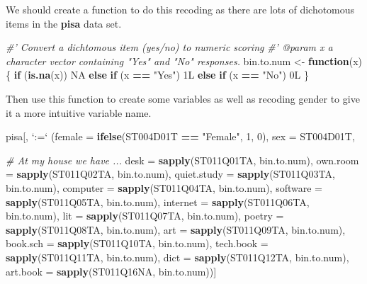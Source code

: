 \documentclass[]{book}
\newenvironment{Shaded}{\begin{snugshade}}{\end{snugshade}}
\newcommand{\CommentTok}[1]{\textcolor[rgb]{0.56,0.35,0.01}{\textit{#1}}}
\newcommand{\ControlFlowTok}[1]{\textcolor[rgb]{0.13,0.29,0.53}{\textbf{#1}}}
\newcommand{\DataTypeTok}[1]{\textcolor[rgb]{0.13,0.29,0.53}{#1}}
\newcommand{\DecValTok}[1]{\textcolor[rgb]{0.00,0.00,0.81}{#1}}
\newcommand{\KeywordTok}[1]{\textcolor[rgb]{0.13,0.29,0.53}{\textbf{#1}}}
\newcommand{\NormalTok}[1]{#1}
\newcommand{\OperatorTok}[1]{\textcolor[rgb]{0.81,0.36,0.00}{\textbf{#1}}}
\newcommand{\OtherTok}[1]{\textcolor[rgb]{0.56,0.35,0.01}{#1}}
\newcommand{\StringTok}[1]{\textcolor[rgb]{0.31,0.60,0.02}{#1}}
\begin{document}
We should create a function to do this recoding as there are lots of dichotomous items in the \textbf{pisa} data set.

\begin{Shaded}
\begin{Highlighting}[]
\CommentTok{#' Convert a dichtomous item (yes/no) to numeric scoring}
\CommentTok{#' @param x a character vector containing "Yes" and "No" responses.}
\NormalTok{bin.to.num <-}\StringTok{ }\ControlFlowTok{function}\NormalTok{(x)\{}
  \ControlFlowTok{if}\NormalTok{ (}\KeywordTok{is.na}\NormalTok{(x)) }\OtherTok{NA}
  \ControlFlowTok{else} \ControlFlowTok{if}\NormalTok{ (x }\OperatorTok{==}\StringTok{ "Yes"}\NormalTok{) 1L}
  \ControlFlowTok{else} \ControlFlowTok{if}\NormalTok{ (x }\OperatorTok{==}\StringTok{ "No"}\NormalTok{) 0L}
\NormalTok{\}}
\end{Highlighting}
\end{Shaded}

Then use this function to create some variables as well as recoding gender to give it a more intuitive variable name.

\begin{Shaded}
\begin{Highlighting}[]
\NormalTok{pisa[, }\StringTok{`}\DataTypeTok{:=}\StringTok{`} 
\NormalTok{     (}\DataTypeTok{female =} \KeywordTok{ifelse}\NormalTok{(ST004D01T }\OperatorTok{==}\StringTok{ "Female"}\NormalTok{, }\DecValTok{1}\NormalTok{, }\DecValTok{0}\NormalTok{),}
       \DataTypeTok{sex =}\NormalTok{ ST004D01T,}
       
       \CommentTok{# At my house we have ...}
       \DataTypeTok{desk =} \KeywordTok{sapply}\NormalTok{(ST011Q01TA, bin.to.num),}
       \DataTypeTok{own.room =} \KeywordTok{sapply}\NormalTok{(ST011Q02TA, bin.to.num),}
       \DataTypeTok{quiet.study =} \KeywordTok{sapply}\NormalTok{(ST011Q03TA, bin.to.num),}
       \DataTypeTok{computer =} \KeywordTok{sapply}\NormalTok{(ST011Q04TA, bin.to.num),}
       \DataTypeTok{software =} \KeywordTok{sapply}\NormalTok{(ST011Q05TA, bin.to.num),}
       \DataTypeTok{internet =} \KeywordTok{sapply}\NormalTok{(ST011Q06TA, bin.to.num),}
       \DataTypeTok{lit =} \KeywordTok{sapply}\NormalTok{(ST011Q07TA, bin.to.num),}
       \DataTypeTok{poetry =} \KeywordTok{sapply}\NormalTok{(ST011Q08TA, bin.to.num),}
       \DataTypeTok{art =} \KeywordTok{sapply}\NormalTok{(ST011Q09TA, bin.to.num),}
       \DataTypeTok{book.sch =} \KeywordTok{sapply}\NormalTok{(ST011Q10TA, bin.to.num),}
       \DataTypeTok{tech.book =} \KeywordTok{sapply}\NormalTok{(ST011Q11TA, bin.to.num),}
       \DataTypeTok{dict =} \KeywordTok{sapply}\NormalTok{(ST011Q12TA, bin.to.num),}
       \DataTypeTok{art.book =} \KeywordTok{sapply}\NormalTok{(ST011Q16NA, bin.to.num))]}
\end{Highlighting}
\end{Shaded}
\end{document}
